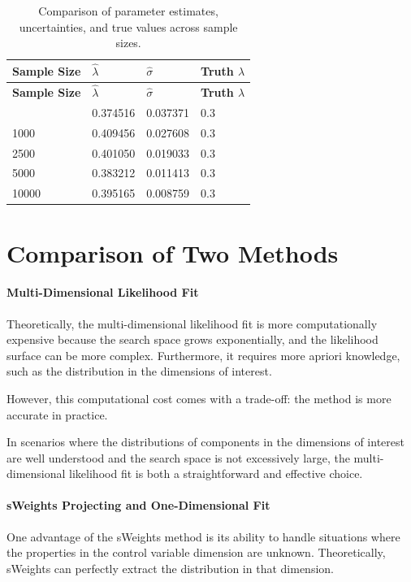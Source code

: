 \documentclass{article}
\begin{document}
\begin{longtable}{llll}
\caption{Comparison of parameter estimates, uncertainties, and true values across sample sizes.}\label{tab:sw_sample_size_estimates}\\
\toprule
\textbf{Sample Size} & \textbf{$\hat{\lambda}$} & \textbf{$\hat{\sigma}$} & \textbf{Truth $\lambda$} \\
\midrule
\endfirsthead
\toprule
\textbf{Sample Size} & \textbf{$\hat{\lambda}$} & \textbf{$\hat{\sigma}$} & \textbf{Truth $\lambda$} \\
\midrule
\endhead
\bottomrule
\endfoot
500 & 0.374516 & 0.037371 & 0.3 \\
1000 & 0.409456 & 0.027608 & 0.3 \\
2500 & 0.401050 & 0.019033 & 0.3 \\
5000 & 0.383212 & 0.011413 & 0.3 \\
10000 & 0.395165 & 0.008759 & 0.3 \\
\end{longtable}


\section{Comparison of Two Methods}

\paragraph{Multi-Dimensional Likelihood Fit}

Theoretically, the multi-dimensional likelihood fit is more computationally expensive because the search space grows exponentially, and the likelihood surface can be more complex. Furthermore, it requires more apriori knowledge, such as the distribution in the dimensions of interest.

However, this computational cost comes with a trade-off: the method is more accurate in practice.

In scenarios where the distributions of components in the dimensions of interest are well understood and the search space is not excessively large, the multi-dimensional likelihood fit is both a straightforward and effective choice.



\paragraph{sWeights Projecting and One-Dimensional Fit}
One advantage of the sWeights method is its ability to handle situations where the properties in the control variable dimension are unknown. Theoretically, sWeights can perfectly extract the distribution in that dimension.
\end{document}
